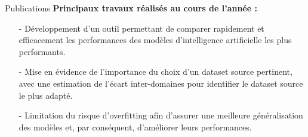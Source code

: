 \begin{subsectionframemod}{Publications}
    \textbf{Principaux travaux réalisés au cours de l'année :}
    \begin{itemize}
        \item[-] Développement d'un outil permettant de comparer rapidement et efficacement les performances des modèles d'intelligence artificielle les plus performants.
        \item[-] Mise en évidence de l'importance du choix d'un dataset source pertinent, avec une estimation de l'écart inter-domaines pour identifier le dataset source le plus adapté.
        \item[-] Limitation du risque d'overfitting afin d'assurer une meilleure généralisation des modèles et, par conséquent, d'améliorer leurs performances.
    \end{itemize}

\end{subsectionframemod}

